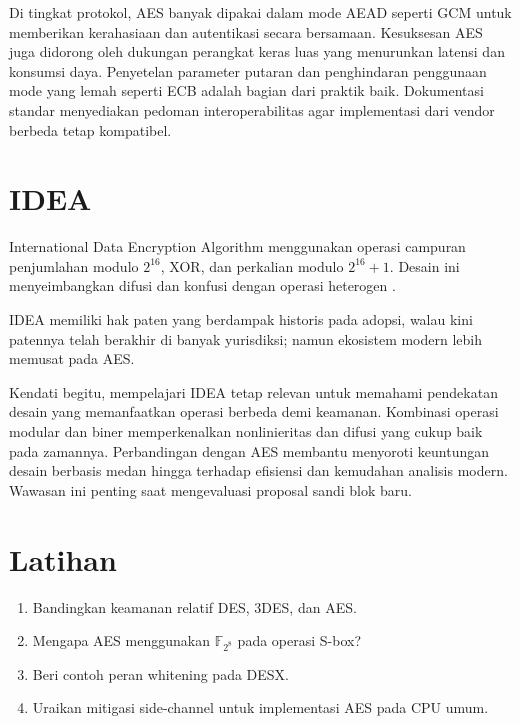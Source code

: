 \documentclass[../main.tex]{subfiles}
\begin{document}
Di tingkat protokol, AES banyak dipakai dalam mode AEAD seperti GCM untuk memberikan kerahasiaan dan autentikasi secara bersamaan. Kesuksesan AES juga didorong oleh dukungan perangkat keras luas yang menurunkan latensi dan konsumsi daya. Penyetelan parameter putaran dan penghindaran penggunaan mode yang lemah seperti ECB adalah bagian dari praktik baik. Dokumentasi standar menyediakan pedoman interoperabilitas agar implementasi dari vendor berbeda tetap kompatibel.

\section{IDEA}
International Data Encryption Algorithm menggunakan operasi campuran penjumlahan modulo \(2^{16}\), XOR, dan perkalian modulo \(2^{16}+1\). Desain ini menyeimbangkan difusi dan konfusi dengan operasi heterogen \citep{stallings}.

IDEA memiliki hak paten yang berdampak historis pada adopsi, walau kini patennya telah berakhir di banyak yurisdiksi; namun ekosistem modern lebih memusat pada AES.

Kendati begitu, mempelajari IDEA tetap relevan untuk memahami pendekatan desain yang memanfaatkan operasi berbeda demi keamanan. Kombinasi operasi modular dan biner memperkenalkan nonlinieritas dan difusi yang cukup baik pada zamannya. Perbandingan dengan AES membantu menyoroti keuntungan desain berbasis medan hingga terhadap efisiensi dan kemudahan analisis modern. Wawasan ini penting saat mengevaluasi proposal sandi blok baru.

\section{Latihan}
\begin{enumerate}
  \item Bandingkan keamanan relatif DES, 3DES, dan AES.
  \item Mengapa AES menggunakan \(\mathbb{F}_{2^8}\) pada operasi S-box?
  \item Beri contoh peran whitening pada DESX.
  \item Uraikan mitigasi side-channel untuk implementasi AES pada CPU umum.
\end{enumerate}
\end{document}
